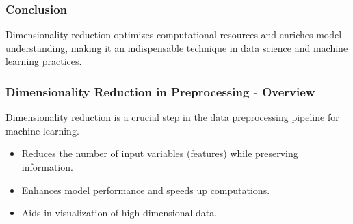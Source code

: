 \documentclass[aspectratio=169]{beamer}
\begin{document}
\begin{frame}[fragile]
    \frametitle{Conclusion}
    Dimensionality reduction optimizes computational resources and enriches model understanding, making it an indispensable technique in data science and machine learning practices. 
\end{frame}

\begin{frame}[fragile]
    \frametitle{Dimensionality Reduction in Preprocessing - Overview}
    Dimensionality reduction is a crucial step in the data preprocessing pipeline for machine learning. 
    \begin{itemize}
        \item Reduces the number of input variables (features) while preserving information.
        \item Enhances model performance and speeds up computations.
        \item Aids in visualization of high-dimensional data.
    \end{itemize}
\end{frame}
\end{document}
